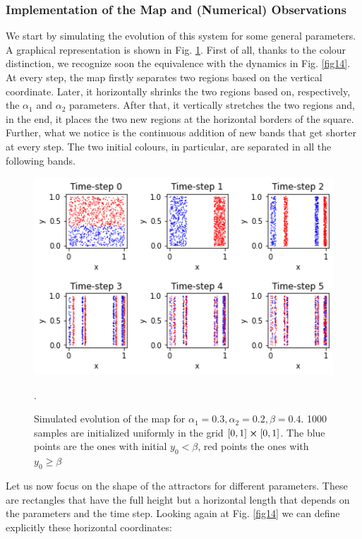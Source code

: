 \documentclass[11pt,titlepage]{article}
\begin{document}
\subsubsection{Implementation of the Map and (Numerical) Observations} \label{implementation_of_the_map_and}
We start by simulating the evolution of this system for some general parameters. A graphical representation is shown in Fig. \ref{fig15}. First of all, thanks to the colour distinction, we recognize soon the equivalence with the dynamics in Fig. \ref{fig14}. At every step, the map firstly separates two regions based on the vertical coordinate. Later, it horizontally shrinks the two regions based on, respectively, the $\alpha_1$ and $\alpha_2$ parameters. After that, it vertically stretches the two regions and, in the end, it places the two new regions at the horizontal borders of the square. Further, what we notice is the continuous addition of new bands that get shorter at every step. The two initial colours, in particular, are separated in all the following bands.
\begin{center}
	\begin{figure} [h]
		\centering
		\includegraphics[width = 5in]{./figures/ex3_1.png}
		\caption{Simulated evolution of the map for $\alpha_1=0.3, \alpha_2=0.2, \beta=0.4$. 1000 samples are initialized uniformly in the grid $[0,1]\cross [0,1]$. The blue points are the ones with initial $y_0<\beta$, red points the ones with $y_0\ge\beta$}.
		\label{fig15}
	\end{figure}
\end{center}
Let us now focus on the shape of the attractors for different parameters. These are rectangles that have the full height but a horizontal length that depends on the parameters and the time step. Looking again at Fig. \ref{fig14} we can define explicitly these horizontal coordinates:
\end{document}
